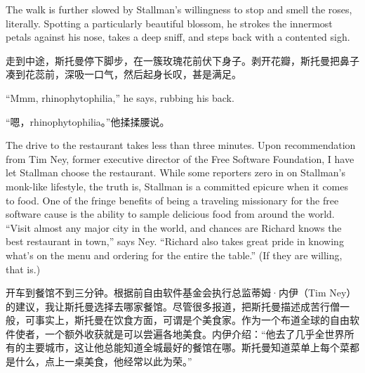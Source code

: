 \ifdefined\eng
The walk is further slowed by Stallman's willingness to stop and smell the roses, literally. Spotting a particularly beautiful blossom, he strokes the innermost petals against his nose, takes a deep sniff, and steps back with a contented sigh.
\fi

\ifdefined\chs
走到中途，斯托曼停下脚步，在一簇玫瑰花前伏下身子。剥开花瓣，斯托曼把鼻子凑到花蕊前，深吸一口气，然后起身长叹，甚是满足。
\fi

\ifdefined\eng
``Mmm, rhinophytophilia,'' he says, rubbing his back.
\fi

\ifdefined\chs
``嗯，rhinophytophilia。''他揉揉腰说。
\fi

\ifdefined\eng
The drive to the restaurant takes less than three minutes. Upon recommendation from Tim Ney, former executive director of the Free Software Foundation, I have let Stallman choose the restaurant. While some reporters zero in on Stallman's monk-like lifestyle, the truth is, Stallman is a committed epicure when it comes to food. One of the fringe benefits of being a traveling missionary for the free software cause is the ability to sample delicious food from around the world. ``Visit almost any major city in the world, and chances are Richard knows the best restaurant in town,'' says Ney. ``Richard also takes great pride in knowing what's on the menu and ordering for the entire the table.''  (If they are willing, that is.)
\fi

\ifdefined\chs
开车到餐馆不到三分钟。根据前自由软件基金会执行总监蒂姆·内伊（Tim Ney）的建议，我让斯托曼选择去哪家餐馆。尽管很多报道，把斯托曼描述成苦行僧一般，可事实上，斯托曼在饮食方面，可谓是个美食家。作为一个布道全球的自由软件使者，一个额外收获就是可以尝遍各地美食。内伊介绍：``他去了几乎全世界所有的主要城市，这让他总能知道全城最好的餐馆在哪。斯托曼知道菜单上每个菜都是什么，点上一桌美食，他经常以此为荣。''
\fi


